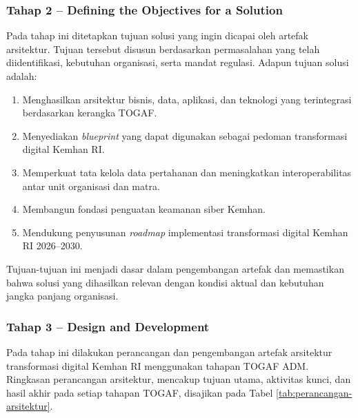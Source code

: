 \subsubsection{Tahap 2 – Defining the Objectives for a Solution}
Pada tahap ini ditetapkan tujuan solusi yang ingin dicapai oleh artefak arsitektur.
Tujuan tersebut disusun berdasarkan permasalahan yang telah diidentifikasi, kebutuhan organisasi, serta mandat regulasi. Adapun tujuan solusi adalah:
\begin{enumerate}
  \item Menghasilkan arsitektur bisnis, data, aplikasi, dan teknologi yang terintegrasi berdasarkan kerangka TOGAF.
  \item Menyediakan \textit{blueprint} yang dapat digunakan sebagai pedoman transformasi digital Kemhan RI.
  \item Memperkuat tata kelola data pertahanan dan meningkatkan interoperabilitas antar unit organisasi dan matra.
  \item Membangun fondasi penguatan keamanan siber Kemhan.
  \item Mendukung penyusunan \textit{roadmap} implementasi transformasi digital Kemhan RI 2026–2030.
\end{enumerate}
Tujuan-tujuan ini menjadi dasar dalam pengembangan artefak dan memastikan bahwa solusi yang dihasilkan relevan dengan kondisi aktual dan kebutuhan jangka panjang organisasi.

\subsubsection{Tahap 3 – Design and Development}
Pada tahap ini dilakukan perancangan dan pengembangan artefak arsitektur transformasi digital Kemhan RI menggunakan tahapan TOGAF ADM.
Ringkasan perancangan arsitektur, mencakup tujuan utama, aktivitas kunci, dan hasil akhir pada setiap tahapan TOGAF, disajikan pada Tabel \ref{tab:perancangan-arsitektur}.

